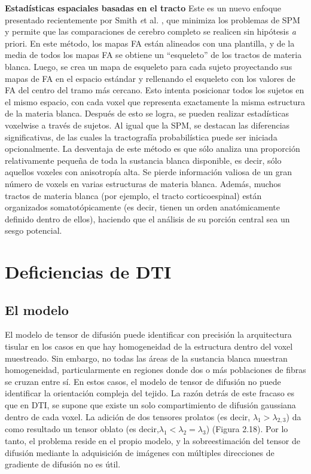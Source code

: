 \textbf{Estadísticas espaciales basadas en el tracto} Este es un nuevo enfoque presentado recientemente por Smith {\emph et al}. \cite{Smith_2006}, que minimiza los problemas de SPM y permite que las comparaciones de cerebro completo se realicen sin hipótesis {\emph a priori}. En este método, los mapas FA están alineados con una plantilla, y de la media de todos los mapas FA se obtiene un ``esqueleto'' de los tractos de materia blanca. Luego, se crea un mapa de esqueleto para cada sujeto proyectando sus mapas de FA en el espacio estándar y rellenando el esqueleto con los valores de FA del centro del tramo más cercano. Esto intenta posicionar todos los sujetos en el mismo espacio, con cada voxel que representa exactamente la misma estructura de la materia blanca. Después de esto se logra, se pueden realizar estadísticas voxelwise a través de sujetos. Al igual que la SPM, se destacan las diferencias significativas, de las cuales la tractografía probabilística puede ser iniciada opcionalmente. La desventaja de este método es que sólo analiza una proporción relativamente pequeña de toda la sustancia blanca disponible, es decir, sólo aquellos voxeles con anisotropía alta. Se pierde información valiosa de un gran número de voxels en varias estructuras de materia blanca. Además, muchos tractos de materia blanca (por ejemplo, el tracto corticoespinal) están organizados somatotópicamente (es decir, tienen un orden anatómicamente definido dentro de ellos), haciendo que el análisis de su porción central sea un sesgo potencial.

\section{Deficiencias de DTI}
\subsection{El modelo}

El modelo de tensor de difusión puede identificar con precisión la arquitectura tisular en los casos en que hay homogeneidad de la estructura dentro del voxel muestreado. Sin embargo, no todas las áreas de la sustancia blanca muestran homogeneidad, particularmente en regiones donde dos o más poblaciones de fibras se cruzan entre sí. En estos casos, el modelo de tensor de difusión no puede identificar la orientación compleja del tejido. La razón detrás de este fracaso es que en DTI, se supone que existe un solo compartimiento de difusión gaussiana dentro de cada voxel. La adición de dos tensores prolatos (es decir, $\lambda_{1} > \lambda_{2,3}$) da como resultado un tensor oblato (es decir,$\lambda_{1} < \lambda_{2} = \lambda_{3}$) (Figura 2.18). Por lo tanto, el problema reside en el propio modelo, y la sobreestimación del tensor de difusión mediante la adquisición de imágenes con múltiples direcciones de gradiente de difusión no es útil.

